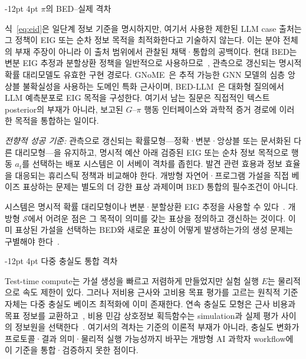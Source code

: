 \documentclass[11pt]{article}
\makeatletter
\renewcommand\subsection{\@startsection{subsection}{2}{\z@}%
  {-12pt \@plus -2pt \@minus -2pt}%
  {4pt \@plus 1pt}%
  {\normalfont\normalsize\bfseries}}
\makeatother
\begin{document}
\subsection{$\pi$의 BED--실제 격차}

식~\ref{eq:eid}은 일단계 정보 기준을 명시하지만, 여기서 사용한 제한된 LLM case 출처는 그 정책이 EIG 또는 순차 정보 목적을 최적화한다고 기술하지 않는다. 이는 분야 전체의 부재 주장이 아니라 이 출처 범위에서 관찰된 채택·통합의 공백이다. 현대 BED는 변분 EIG 추정과 분할상환 정책을 일반적으로 사용하므로~\citep{foster2019variational,foster2021dad}, 관측으로 갱신되는 명시적 확률 대리모델도 유효한 구현 경로다. GNoME~\citep{merchant2023gnome}은 추적 가능한 GNN 모델의 심층 앙상블 불확실성을 사용하는 도메인 특화 근사이며, BED-LLM~\citep{choudhury2026bedllm}은 대화형 질의에서 LLM 예측분포로 EIG 목적을 구성한다. 여기서 남는 질문은 직접적인 텍스트 posterior의 부재가 아니라, 보고된 $G$--$\pi$ 행동 인터페이스와 과학적 증거 경로에 이러한 목적을 통합하는 일이다.

\textit{전향적 성공 기준:} 관측으로 갱신되는 확률모형---정확·변분·앙상블 또는 문서화된 다른 대리모형---을 유지하고, 명시적 예산 아래 검증된 EIG 또는 순차 정보 목적으로 행동 $a_t$를 선택하는 배포 시스템은 이 서베이 격차를 좁힌다. 발견 관련 효용과 정보 효율을 대응되는 휴리스틱 정책과 비교해야 한다. 개방형 자연어·프로그램 가설을 직접 베이즈 표상하는 문제는 별도의 더 강한 표상 과제이며 BED 통합의 필수조건이 아니다.

시스템은 명시적 확률 대리모형이나 변분·분할상환 EIG 추정을 사용할 수 있다~\citep{foster2019variational,foster2021dad}. 개방형 $\mathcal S$에서 어려운 점은 그 목적이 의미를 갖는 표상을 정의하고 갱신하는 것이다. 이미 표상된 가설을 선택하는 BED와 새로운 표상이 어떻게 발생하는가의 생성 문제는 구별해야 한다~\citep{yanai2019night}.

\subsection{다중 충실도 통합 격차}
\label{sec:op3}

Test-time compute는 가설 생성을 빠르고 저렴하게 만들었지만 실험 실행 $E$는 물리적으로 속도 제한이 있다. 그러나 저비용 근사와 고비용 목표 평가를 고르는 원칙적 기준 자체는 다중 충실도 베이즈 최적화에 이미 존재한다. 연속 충실도 모형은 근사 비용과 목표 정보를 교환하고~\citep{kandasamy2017multifidelity}, 비용 민감 상호정보 획득함수는 simulation과 실제 평가 사이의 정보원을 선택한다~\citep{song2019multifidelity}. 여기서의 격차는 기준의 이론적 부재가 아니라, 충실도 변화가 프로토콜·결과 의미·물리적 실행 가능성까지 바꾸는 개방형 AI 과학자 workflow에 이 기준을 통합·검증하지 못한 점이다.
\end{document}
